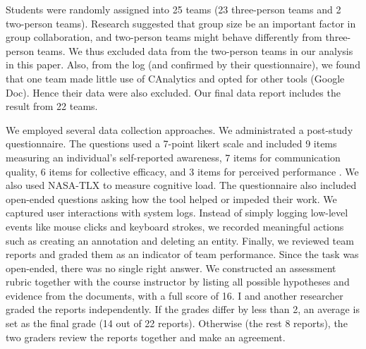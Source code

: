 Students were randomly assigned into 25 teams (23 three-person teams and 2
two-person teams). Research suggested that group size be an important factor in
group collaboration, and two-person teams might behave differently from
three-person teams. We thus excluded data from the two-person teams in our
analysis in this paper. Also, from the log (and confirmed by their
questionnaire), we found that one team made little use of CAnalytics and opted
for other tools (Google Doc). Hence their data were also excluded. Our final data report includes the result from 22 teams.

We employed several data collection approaches. We administrated a post-study
questionnaire. The questions used a 7-point likert scale and included 9 items measuring an individual's
self-reported awareness, 7 items for
communication quality, 6 items for collective efficacy, and 3 items for perceived performance \citep{Convertino2011}. We also used NASA-TLX \citep{Hart1988} to measure cognitive load. The questionnaire
also included open-ended questions asking how the tool helped or impeded their
work. We captured user interactions with system logs. Instead of simply logging
low-level events like mouse clicks and keyboard strokes, we recorded meaningful actions such
as creating an annotation and deleting an entity. Finally, we reviewed team
reports and graded them as an indicator of team performance. Since the task was
open-ended, there was no single right answer. We constructed an assessment
rubric together with the course instructor by listing all possible hypotheses
and evidence from the documents, with a full score of 16. I and another researcher graded the reports independently. If the grades differ by
less than 2, an average is set as the final grade (14 out of 22 reports).
Otherwise (the rest 8 reports), the two graders review the reports together and
make an agreement.
